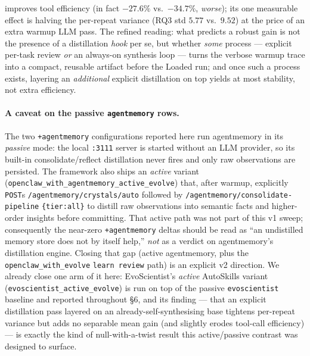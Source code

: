\documentclass{article}
\begin{document}
improves tool efficiency (in fact $-27.6\%$ vs.\ $-34.7\%$, \emph{worse}); its one measurable effect is halving the per-repeat variance (RQ3 std $5.77$ vs.\ $9.52$) at the price of an extra warmup LLM pass. The refined reading: what predicts a robust gain is not the presence of a distillation \emph{hook} per se, but whether \emph{some} process --- explicit per-task review \emph{or} an always-on synthesis loop --- turns the verbose warmup trace into a compact, reusable artifact before the Loaded run; and once such a process exists, layering an \emph{additional} explicit distillation on top yields at most stability, not extra efficiency.

\paragraph{A caveat on the passive \texttt{agentmemory} rows.} The two \texttt{+agentmemory} configurations reported here run agentmemory in its \emph{passive} mode: the local \texttt{:3111} server is started without an LLM provider, so its built-in consolidate/reflect distillation never fires and only raw observations are persisted. The framework also ships an \emph{active} variant (\texttt{openclaw\_with\_agentmemory\_active\_evolve}) that, after warmup, explicitly \texttt{POST}s \texttt{/agentmemory/crystals/auto} followed by \texttt{/agentmemory/consolidate-pipeline} \texttt{\{tier:all\}} to distill raw observations into semantic facts and higher-order insights before committing. That active path was not part of this v1 sweep; consequently the near-zero \texttt{+agentmemory} deltas should be read as ``an undistilled memory store does not by itself help,'' \emph{not} as a verdict on agentmemory's distillation engine. Closing that gap (active agentmemory, plus the \texttt{openclaw\_with\_evolve} \texttt{learn review} path) is an explicit v2 direction. We already close one arm of it here: EvoScientist's \emph{active} AutoSkills variant (\texttt{evoscientist\_active\_evolve}) is run on top of the passive \texttt{evoscientist} baseline and reported throughout \S6, and its finding --- that an explicit distillation pass layered on an already-self-synthesising base tightens per-repeat variance but adds no separable mean gain (and slightly erodes tool-call efficiency) --- is exactly the kind of null-with-a-twist result this active/passive contrast was designed to surface.
\end{document}
